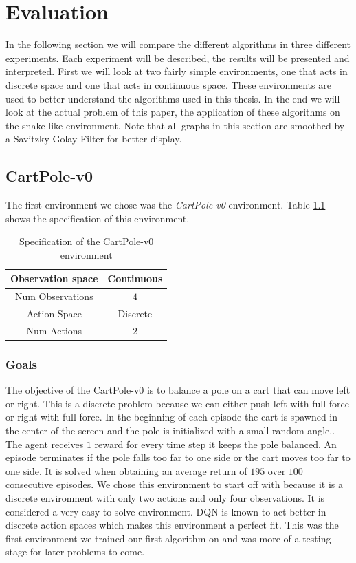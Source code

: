 \chapter{Evaluation}
\label{section:results}

In the following section we will compare the different algorithms in three different experiments.
Each experiment will be described, the results will be presented and interpreted.
First we will look at two fairly simple environments, one that acts in discrete space and one that acts in continuous space.
These environments are used to better understand the algorithms used in this thesis.
In the end we will look at the actual problem of this paper, the application of these algorithms on the snake-like environment.
Note that all graphs in this section are smoothed by a Savitzky-Golay-Filter for better display.

\section{CartPole-v0}

The first environment we chose was the \emph{CartPole-v0} environment.
Table \ref{tb:cartpole_specs} shows the specification of this environment.

\begin{table}[H]
  \centering
  \begin{tabular}{| c | c |}
      \hline
      Observation space & Continuous\\
      \hline
      Num Observations & $4$\\
      \hline
      Action Space & Discrete\\
      \hline
      Num Actions & $2$\\
      \hline
  \end{tabular}
\caption{Specification of the CartPole-v0 environment}
\label{tb:cartpole_specs}
\end{table}

\subsection{Goals}

The objective of the CartPole-v0 is to balance a pole on a cart that can move left or right.
This is a discrete problem because we can either push left with full force or right with full force.
In the beginning of each episode the cart is spawned in the center of the screen and the pole is initialized with a small random angle..
The agent receives $1$ reward for every time step it keeps the pole balanced.
An episode terminates if the pole falls too far to one side or the cart moves too far to one side.
It is solved when obtaining an average return of $195$ over $100$ consecutive episodes.
We chose this environment to start off with because it is a discrete environment with only two actions and only four observations.
It is considered a very easy to solve environment.
DQN is known to act better in discrete action spaces which makes this environment a perfect fit.
This was the first environment we trained our first algorithm on and was more of a testing stage for later problems to come.

